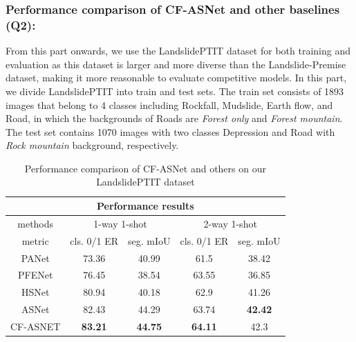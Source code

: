 \documentclass{ieeeaccess}
\begin{document}
\subsubsection{Performance comparison of CF-ASNet and other baselines (Q2):}
From this part onwards, we use the LandslidePTIT dataset for both training and evaluation as this dataset is larger and more diverse than the Landslide-Premise dataset, making it more reasonable to evaluate competitive models. In this part, we divide LandslidePTIT into train and test sets. The train set consists of 1893 images that belong to 4 classes including Rockfall, Mudslide, Earth flow, and Road, in which the backgrounds of Roads are {\em Forest only} and {\em Forest mountain}. The test set contains 1070 images with two classes Depression and Road with {\em Rock mountain} background, respectively.

\begin{table}[h]
\caption{Performance comparison of CF-ASNet and others on our LandslidePTIT dataset}
\centering
\begin{tabular}{|ccccc|}
\hline
\multicolumn{5}{|c|}{Performance results}                                                                                                                        \\ \hline
\multicolumn{1}{|c|}{methods}  & \multicolumn{2}{c|}{1-way 1-shot}                                         & \multicolumn{2}{c|}{2-way 1-shot}                    \\ \hline
\multicolumn{1}{|c|}{metric}   & \multicolumn{1}{c|}{cls. 0/1 ER}    & \multicolumn{1}{c|}{seg. mIoU}      & \multicolumn{1}{c|}{cls. 0/1 ER}    & seg. mIoU      \\ \hline
\multicolumn{1}{|c|}{PANet}    & \multicolumn{1}{c|}{73.36}          & \multicolumn{1}{c|}{40.99}          & \multicolumn{1}{c|}{61.5}           & 38.42          \\ \hline
\multicolumn{1}{|c|}{PFENet}   & \multicolumn{1}{c|}{76.45}          & \multicolumn{1}{c|}{38.54}          & \multicolumn{1}{c|}{63.55}          & 36.85          \\ \hline
\multicolumn{1}{|c|}{HSNet}    & \multicolumn{1}{c|}{80.94}          & \multicolumn{1}{c|}{40.18}          & \multicolumn{1}{c|}{62.9}           & 41.26          \\ \hline
\multicolumn{1}{|c|}{ASNet}    & \multicolumn{1}{c|}{82.43}          & \multicolumn{1}{c|}{44.29}          & \multicolumn{1}{c|}{63.74}          & \textbf{42.42} \\ \hline
\multicolumn{1}{|l|}{CF-ASNET} & \multicolumn{1}{c|}{\textbf{83.21}} & \multicolumn{1}{c|}{\textbf{44.75}} & \multicolumn{1}{c|}{\textbf{64.11}} & 42.3           \\ \hline
\end{tabular}
\label{tab:model-eval}
\end{table}
\end{document}
